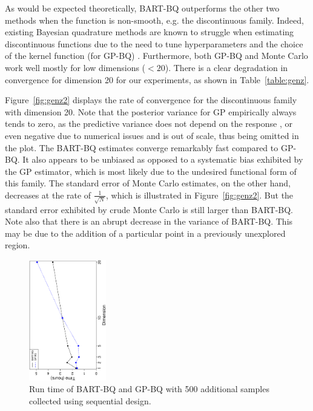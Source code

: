 As would be expected theoretically, BART-BQ outperforms the other two methods when the function is non-smooth, e.g. the discontinuous family. Indeed, existing Bayesian quadrature methods are known to struggle when estimating discontinuous functions due to the need to tune hyperparameters and the choice of the kernel function (for GP-BQ) \cite{Rasmussen:2002:BMC:2968618.2968681}. Furthermore, both GP-BQ and Monte Carlo work well mostly for low dimensions ($<20$). There is a clear degradation in convergence for dimension 20 for our experiments, as shown in Table~\ref{table:genz}.
 
Figure~\ref{fig:genz2} displays the rate of convergence for the discontinuous family with dimension 20. Note that the posterior variance for GP empirically always tends to zero, as the predictive variance does not depend on the response \cite{Rasmussen:2005:GPM:1162254}, or even negative due to numerical issues \cite{Rasmussen:2002:BMC:2968618.2968681} and is out of scale, thus being omitted in the plot. %
The BART-BQ estimates converge remarkably fast compared to GP-BQ. It also appears to be unbiased as opposed to a systematic bias exhibited by the GP estimator, which is most likely due to the undesired functional form of this family. The standard error of Monte Carlo estimates, on the other hand, decreases at the rate of $\frac{1}{\sqrt{N}}$, which is illustrated in Figure~\ref{fig:genz2}. But the standard error exhibited by crude Monte Carlo is still larger than BART-BQ. Note also that there is an abrupt decrease in the variance of BART-BQ. This may be due to the addition of a particular point in a previously unexplored region. 

\begin{figure}[!t]
    \centering
    \vspace*{0mm}
    \includegraphics[width = 0.3\textwidth, angle = -90]{../../report/Figures/runTimePlot.eps}
    \vspace*{-2mm}
    \caption{Run time of BART-BQ and GP-BQ with 500 additional samples collected using sequential design.}
    \label{fig:timePlot}
    \vspace*{-0.8em}
\end{figure}


